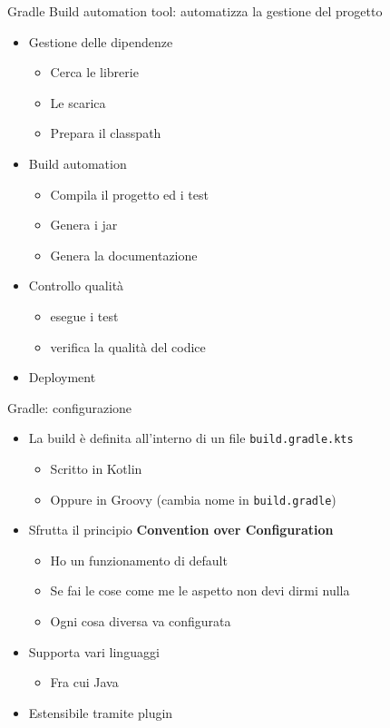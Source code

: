 \documentclass[presentation]{beamer}
\begin{document}
\begin{frame}{Gradle}
    Build automation tool: automatizza la gestione del progetto
    \begin{itemize}
        \item Gestione delle dipendenze
        \begin{itemize}
            \item Cerca le librerie
            \item Le scarica
            \item Prepara il classpath
        \end{itemize}
        \item Build automation
        \begin{itemize}
            \item Compila il progetto ed i test
            \item Genera i jar
            \item Genera la documentazione
        \end{itemize}
        \item Controllo qualità
        \begin{itemize}
            \item esegue i test
            \item verifica la qualità del codice
        \end{itemize}
        \item Deployment
    \end{itemize}
\end{frame}

\begin{frame}[allowframebreaks]{Gradle: configurazione}
    \begin{itemize}
        \item La build è definita all'interno di un file \texttt{build.gradle.kts}
        \begin{itemize}
            \item Scritto in Kotlin
            \item Oppure in Groovy (cambia nome in \texttt{build.gradle})
        \end{itemize}
        \item Sfrutta il principio \textbf{Convention over Configuration}
        \begin{itemize}
            \item Ho un funzionamento di default
            \item Se fai le cose come me le aspetto non devi dirmi nulla
            \item Ogni cosa diversa va configurata
        \end{itemize}
        \item Supporta vari linguaggi
        \begin{itemize}
            \item Fra cui Java
        \end{itemize}
        \item Estensibile tramite plugin
    \end{itemize}
\end{frame}
\end{document}
